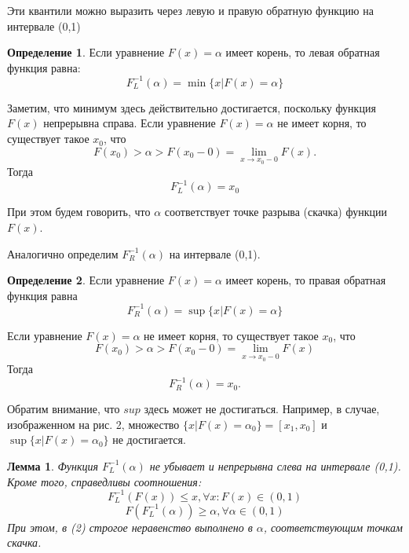 \documentclass[14pt,a4paper]{article}
\theoremstyle{plain}
\newtheorem{Lemma}{Лемма}[section]
\theoremstyle{definition}
\newtheorem{Def}{Определение}[section]
\begin{document}
Эти квантили можно выразить через левую и правую обратную функцию на интервале (0,1)
\begin{Def} \label{main}
Если уравнение $F(x) = \alpha$ имеет корень, то левая обратная функция равна:
$$
F^{-1}_{L}(\alpha) = \min\{x|F(x)=\alpha  \}
$$
\end{Def}
Заметим, что минимум здесь действительно достигается, поскольку функция $F(x)$ непрерывна справа.
Если уравнение $F(x) = \alpha$ не имеет корня, то существует такое $x_0$, что
$$
F(x_0) > \alpha > F(x_0-0) = \lim\limits_{x \rightarrow x_0-0}F(x).
$$
Тогда
$$
F^{-1}_{L}(\alpha) = x_0
$$

При этом будем говорить, что $\alpha$ соответствует точке разрыва (скачка) функции $F(x)$.

Аналогично определим $F^{-1}_{R}(\alpha)$ на интервале (0,1).
\begin{Def} \label{main}
Если уравнение $F(x) = \alpha$ имеет корень, то правая обратная функция равна
$$
F^{-1}_{R}(\alpha) = \sup\{x|F(x)=\alpha  \}
$$
\end{Def}
Если уравнение $F(x) = \alpha$ не имеет корня, то существует такое $x_0$, что
$$
F(x_0) > \alpha > F(x_0-0) = \lim\limits_{x \rightarrow x_0-0}F(x)
$$
Тогда
$$
F^{-1}_{R}(\alpha) = x_0.
$$

Обратим внимание, что $sup$ здесь может не достигаться.
Например, в случае, изображенном на  рис. 2,
множество $\{x|F(x) = \alpha_0 \} = [x_1, x_0]$ и $\sup\{x|F(x) = \alpha_0  \}$ не достигается.


\begin{Lemma} \label{main} Функция $F^{-1}_{L}(\alpha)$ не убывает и непрерывна слева на интервале (0,1). Кроме того, справедливы соотношения:
\begin{equation}
F^{-1}_{L}(F(x))\le x,  \forall x: F(x) \in (0,1)
\end{equation}
\begin{equation}
F(F^{-1}_{L}(\alpha)) \ge \alpha,  \forall \alpha \in (0,1)
\end{equation}
При этом, в (2) строгое неравенство выполнено в $\alpha$, соответствующим точкам скачка.
\end{Lemma}
\end{document}
